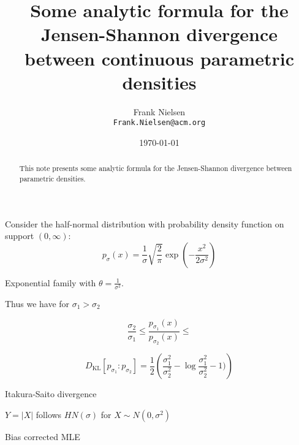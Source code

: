 \documentclass{article}
\title{Some analytic formula for the Jensen-Shannon divergence between continuous parametric densities}
\author{Frank Nielsen\\ {\tt Frank.Nielsen@acm.org}}
\date{\today}
\def\KL{\mathrm{KL}}
\begin{document}
\maketitle

\begin{abstract}
This note presents some analytic formula for the Jensen-Shannon divergence between parametric densities.
\end{abstract}

Consider the half-normal distribution with probability density function on support $(0,\infty)$:
$$
p_\sigma(x)=\frac{1}{\sigma}\sqrt{\frac{2}{\pi}}\exp(-\frac{x^2}{2\sigma^2})
$$

Exponential family with $\theta=\frac{1}{\sigma^2}$.


Thus we have for $\sigma_1>\sigma_2$

$$
\frac{\sigma_2}{\sigma_1}\leq \frac{p_{\sigma_1}(x)}{p_{\sigma_2}(x)} \leq 
$$

$$
D_\KL[p_{\sigma_1}:p_{\sigma_2}] = \frac{1}{2}\left( 
\frac{\sigma_1^2}{\sigma_2^2}-\log \frac{\sigma_1^2}{\sigma_2^2}-1)
\right)
$$
 
Itakura-Saito divergence

$Y=|X|$ follows $HN(\sigma)$ for $X\sim N(0,\sigma^2)$

Bias corrected MLE



\end{document}
